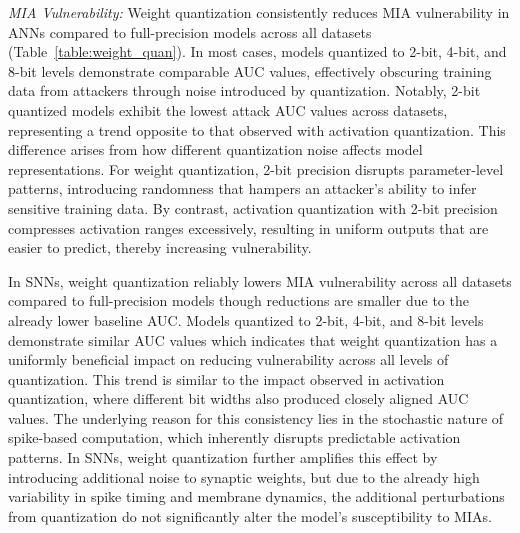 
\textit{MIA Vulnerability:} Weight quantization consistently reduces MIA vulnerability in ANNs compared to full-precision models across all datasets (Table~\ref{table:weight_quan}). In most cases, models quantized to 2-bit, 4-bit, and 8-bit levels demonstrate comparable AUC values, effectively obscuring training data from attackers through noise introduced by quantization. Notably, 2-bit quantized models exhibit the lowest attack AUC values across datasets, representing a trend opposite to that observed with activation quantization. This difference arises from how different quantization noise affects model representations. For weight quantization, 2-bit precision disrupts parameter-level patterns, introducing randomness that hampers an attacker’s ability to infer sensitive training data. By contrast, activation quantization with 2-bit precision compresses activation ranges excessively, resulting in uniform outputs that are easier to predict, thereby increasing vulnerability.


In SNNs, weight quantization reliably lowers MIA vulnerability across all datasets compared to full-precision models  though reductions are smaller due to the already lower baseline AUC. Models quantized to 2-bit, 4-bit, and 8-bit levels demonstrate similar AUC values which indicates that weight quantization has a uniformly beneficial impact on reducing vulnerability across all levels of quantization. This trend is similar to the impact observed in activation quantization, where different bit widths also produced closely aligned AUC values. The underlying reason for this consistency lies in the stochastic nature of spike-based computation, which inherently disrupts predictable activation patterns. In SNNs, weight quantization further amplifies this effect by introducing additional noise to synaptic weights, but due to the already high variability in spike timing and membrane dynamics, the additional perturbations from quantization do not significantly alter the model’s susceptibility to MIAs.

